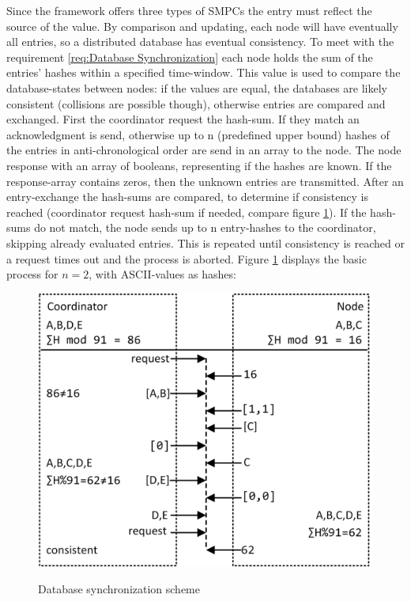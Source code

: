 		Since the framework offers three types of \glspl{SMPC} the entry must reflect the source of the value. By comparison and updating, each node will have eventually all entries, so a distributed database has eventual consistency.
		To meet with the requirement \ref{req:Database Synchronization} each node holds the sum of the entries' hashes within a specified time-window. This value is used to compare the database-states between nodes: if the values are equal, the databases are likely consistent (collisions are possible though), otherwise entries are compared and exchanged. First the coordinator request the hash-sum. If they match an acknowledgment is send, otherwise up to n (predefined upper bound) hashes of the entries in anti-chronological order are send in an array to the node. The node response with an array of booleans, representing if the hashes are known. If the response-array contains zeros, then the unknown entries are transmitted. After an entry-exchange the hash-sums are compared, to determine if consistency is reached (coordinator request hash-sum if needed, compare figure \ref{figure:Database synchronization scheme}). If the hash-sums do not match, the node sends up to n entry-hashes to the coordinator, skipping already evaluated entries. This is repeated until consistency is reached or a request times out and the process is aborted.
		Figure \ref{figure:Database synchronization scheme} displays the basic process for $n=2$, with ASCII-values as hashes:
		
		\begin{figure}[!htbp] %
			\caption{Database synchronization scheme}
			\includegraphics[scale=1.0]{figures/db-synchronization.png}
			\label{figure:Database synchronization scheme}
		\end{figure}
		
